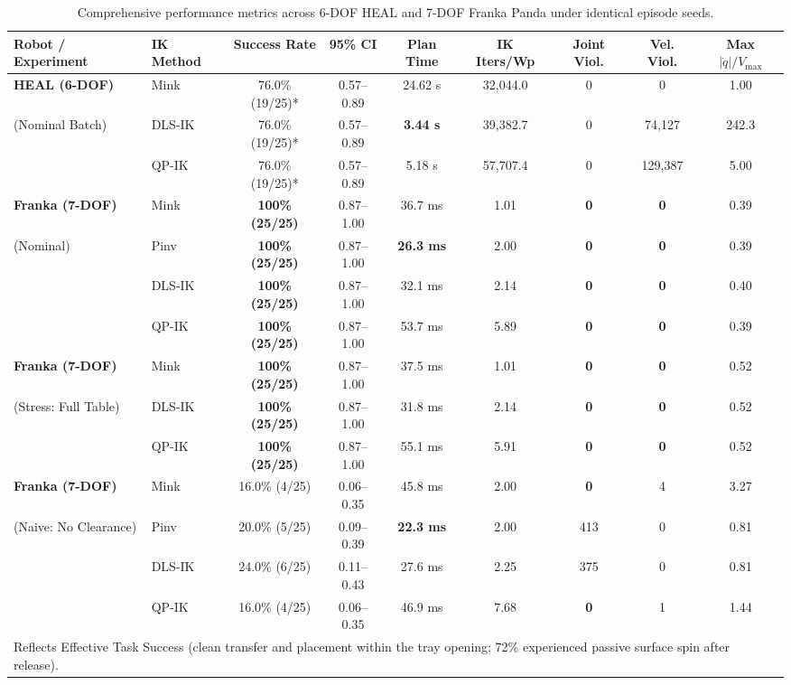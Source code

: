\documentclass[10pt,twocolumn]{article}
\begin{document}
\begin{table}[t]
\centering
\small
\caption{Comprehensive performance metrics across 6-DOF HEAL and 7-DOF Franka Panda under identical episode seeds.}
\label{tab:master_results}
\begin{tabular}{llccccccc}
\toprule
\textbf{Robot / Experiment} & \textbf{IK Method} & \textbf{Success Rate} & \textbf{95\% CI} & \textbf{Plan Time} & \textbf{IK Iters/Wp} & \textbf{Joint Viol.} & \textbf{Vel. Viol.} & \textbf{Max $|\dot{q}|/V_{\max}$} \\
\midrule
\textbf{HEAL (6-DOF)} & Mink & 76.0\% (19/25)* & 0.57--0.89 & 24.62 s & 32,044.0 & 0 & 0 & 1.00 \\
(Nominal Batch) & DLS-IK & 76.0\% (19/25)* & 0.57--0.89 & \textbf{3.44 s} & 39,382.7 & 0 & 74,127 & 242.3 \\
& QP-IK & 76.0\% (19/25)* & 0.57--0.89 & 5.18 s & 57,707.4 & 0 & 129,387 & 5.00 \\
\midrule
\textbf{Franka (7-DOF)} & Mink & \textbf{100\% (25/25)} & 0.87--1.00 & 36.7 ms & 1.01 & \textbf{0} & \textbf{0} & 0.39 \\
(Nominal) & Pinv & \textbf{100\% (25/25)} & 0.87--1.00 & \textbf{26.3 ms} & 2.00 & \textbf{0} & \textbf{0} & 0.39 \\
& DLS-IK & \textbf{100\% (25/25)} & 0.87--1.00 & 32.1 ms & 2.14 & \textbf{0} & \textbf{0} & 0.40 \\
& QP-IK & \textbf{100\% (25/25)} & 0.87--1.00 & 53.7 ms & 5.89 & \textbf{0} & \textbf{0} & 0.39 \\
\midrule
\textbf{Franka (7-DOF)} & Mink & \textbf{100\% (25/25)} & 0.87--1.00 & 37.5 ms & 1.01 & \textbf{0} & \textbf{0} & 0.52 \\
(Stress: Full Table)& DLS-IK & \textbf{100\% (25/25)} & 0.87--1.00 & 31.8 ms & 2.14 & \textbf{0} & \textbf{0} & 0.52 \\
& QP-IK & \textbf{100\% (25/25)} & 0.87--1.00 & 55.1 ms & 5.91 & \textbf{0} & \textbf{0} & 0.52 \\
\midrule
\textbf{Franka (7-DOF)} & Mink & 16.0\% (4/25) & 0.06--0.35 & 45.8 ms & 2.00 & \textbf{0} & 4 & 3.27 \\
(Naive: No Clearance)& Pinv & 20.0\% (5/25) & 0.09--0.39 & \textbf{22.3 ms} & 2.00 & 413 & 0 & 0.81 \\
& DLS-IK & 24.0\% (6/25) & 0.11--0.43 & 27.6 ms & 2.25 & 375 & 0 & 0.81 \\
& QP-IK & 16.0\% (4/25) & 0.06--0.35 & 46.9 ms & 7.68 & \textbf{0} & 1 & 1.44 \\
\bottomrule
\multicolumn{9}{l}{\footnotesize *Reflects Effective Task Success (clean transfer and placement within the tray opening; 72\% experienced passive surface spin after release).}
\end{tabular}
\end{table}
\end{document}
